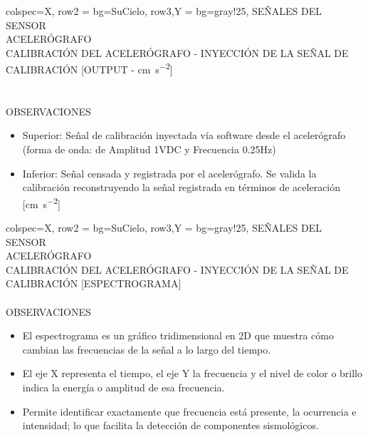 \begin{tblr}{
        colspec={X},
        row{2} = {bg=SuCielo},
        row{3,Y} = {bg=gray!25},
    } %
    SEÑALES DEL SENSOR \\
    ACELERÓGRAFO \MakeUppercase{} \\
    CALIBRACIÓN DEL ACELERÓGRAFO - INYECCIÓN DE LA SEÑAL DE CALIBRACIÓN [OUTPUT - \unit{\centi\meter\per\square\second}] \\
     \\
     \\
    OBSERVACIONES \\
    \begin{itemize}
        \item Superior: Señal de calibración inyectada vía software desde el acelerógrafo (forma de onda:  de Amplitud 1VDC y Frecuencia 0.25Hz)
        \item Inferior: Señal censada y registrada por el acelerógrafo. Se valida la calibración reconstruyendo la señal registrada en términos de aceleración [\unit{\centi\meter\per\square\second}]
    \end{itemize}
\end{tblr}
% 
\newpage
\begin{tblr}{
        colspec={X},
        row{2} = {bg=SuCielo},
        row{3,Y} = {bg=gray!25},
    } %
    SEÑALES DEL SENSOR \\
    ACELERÓGRAFO \MakeUppercase{} \\
    CALIBRACIÓN DEL ACELERÓGRAFO - INYECCIÓN DE LA SEÑAL DE CALIBRACIÓN [ESPECTROGRAMA] \\
     \\
    OBSERVACIONES \\
    \begin{itemize}
        \item El espectrograma es un gráfico tridimensional en 2D que muestra cómo cambian las frecuencias de la señal a lo largo del tiempo.
        \item El eje X representa el tiempo, el eje Y la frecuencia y el nivel de color o brillo indica la energía o amplitud de esa frecuencia.
        \item Permite identificar exactamente que frecuencia está presente, la ocurrencia e intensidad; lo que facilita la detección de componentes sismológicos.
    \end{itemize}
\end{tblr}
% 
